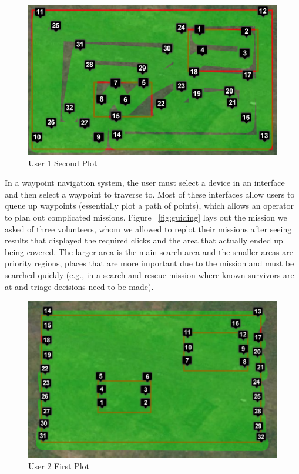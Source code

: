 \documentclass{sig-alternate-ipsn13}
\begin{document}
\begin{figure}[h]
  \centering
  \includegraphics[scale=0.4]{user_waypoints_2}
  \caption{User 1 Second Plot}
  \label{fig:user1_2}
\end{figure}


In a waypoint navigation system, the user must select a device in an interface
and then select a waypoint to traverse to. Most of these interfaces allow users
to queue up waypoints (essentially plot a path of points), which allows an
operator to plan out complicated missions. Figure ~\ref{fig:guiding} lays out
the mission we asked of three volunteers, whom we allowed to replot their
missions after seeing results that displayed the required clicks and the area
that actually ended up being covered. The larger area is the main search area
and the smaller areas are priority regions, places that are more important due
to the mission and must be searched quickly (e.g., in a search-and-rescue
mission where known survivors are at and triage decisions need to be made).

\iffalse

\begin{figure}[h]
  \centering
  \includegraphics[scale=0.45]{user_waypoints_3}
  \caption{User 2 First  Plot}
  \label{fig:user2_1}
\end{figure}
\end{document}
